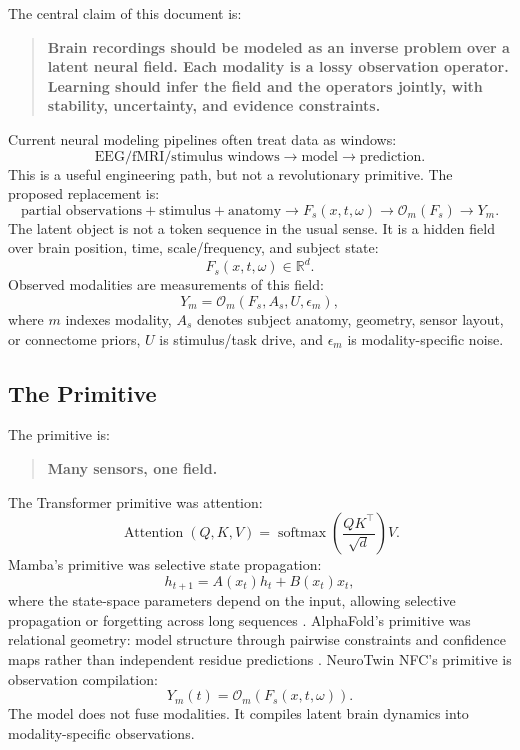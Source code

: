 \documentclass[11pt]{article}
\newcommand{\R}{\mathbb{R}}
\newcommand{\softmax}{\operatorname{softmax}}
\newcommand{\Obs}{\mathcal{O}}
\begin{document}
The central claim of this document is:
\begin{quote}
\textbf{Brain recordings should be modeled as an inverse problem over a latent neural field. Each modality is a lossy observation operator. Learning should infer the field and the operators jointly, with stability, uncertainty, and evidence constraints.}
\end{quote}

Current neural modeling pipelines often treat data as windows:
\begin{equation}
\text{EEG/fMRI/stimulus windows} \longrightarrow \text{model} \longrightarrow \text{prediction}.
\end{equation}
This is a useful engineering path, but not a revolutionary primitive. The proposed replacement is:
\begin{equation}
\text{partial observations} + \text{stimulus} + \text{anatomy}
\longrightarrow F_s(x,t,\omega)
\longrightarrow \Obs_m(F_s)
\longrightarrow Y_m.
\end{equation}
The latent object is not a token sequence in the usual sense. It is a hidden field over brain position, time, scale/frequency, and subject state:
\begin{equation}
F_s(x,t,\omega) \in \R^d.
\end{equation}
Observed modalities are measurements of this field:
\begin{equation}
Y_m = \Obs_m(F_s,A_s,U,\epsilon_m),
\end{equation}
where $m$ indexes modality, $A_s$ denotes subject anatomy, geometry, sensor layout, or connectome priors, $U$ is stimulus/task drive, and $\epsilon_m$ is modality-specific noise.

\subsection{The Primitive}

The primitive is:
\begin{quote}
\textbf{Many sensors, one field.}
\end{quote}

The Transformer primitive was attention:
\begin{equation}
\operatorname{Attention}(Q,K,V) = \softmax\left(\frac{QK^\top}{\sqrt{d}}\right)V.
\end{equation}
Mamba's primitive was selective state propagation:
\begin{equation}
h_{t+1} = A(x_t)h_t + B(x_t)x_t,
\end{equation}
where the state-space parameters depend on the input, allowing selective propagation or forgetting across long sequences \cite{mamba}. AlphaFold's primitive was relational geometry: model structure through pairwise constraints and confidence maps rather than independent residue predictions \cite{alphafold2,alphafold3}. NeuroTwin NFC's primitive is observation compilation:
\begin{equation}
\boxed{Y_m(t) = \Obs_m(F_s(x,t,\omega)).}
\end{equation}
The model does not fuse modalities. It compiles latent brain dynamics into modality-specific observations.
\end{document}
